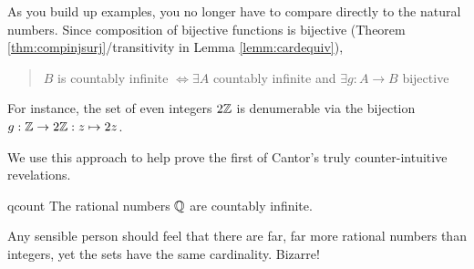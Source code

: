 As you build up examples, you no longer have to compare directly to the natural numbers. Since composition of bijective functions is bijective (Theorem \ref{thm:compinjsurj}/transitivity in Lemma \ref{lemm:cardequiv}),
\begin{quote}
	$B$ is countably infinite $\iff\exists A$ countably infinite and $\exists g:A\to B$ bijective
\end{quote}
For instance, the set of even integers $2\mathbb{Z}$ is denumerable via the bijection $g:\mathbb{Z}\to 2\mathbb{Z}:z\mapsto 2z$.
\medbreak

We use this approach to help prove the first of Cantor's truly counter-intuitive revelations.

\begin{thm}{}{qcount}
	The rational numbers $\mathbb{Q}$ are countably infinite.
\end{thm}


Any sensible person should feel that there are far, far more rational numbers than integers, yet the sets have the same cardinality. Bizarre!

